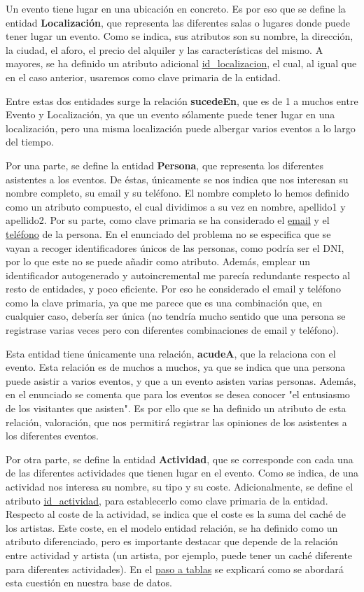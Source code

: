 \documentclass[a4paper,onecolumn]{article}
\begin{document}
\begin{sloppypar}
Un evento tiene lugar en una ubicación en concreto. Es por eso que se define la entidad \textbf{Localización}, que representa las diferentes
salas o lugares donde puede tener lugar un evento. Como se indica, sus atributos son su nombre, la dirección, la ciudad, el aforo,
el precio del alquiler y las características del mismo. A mayores, se ha definido un atributo adicional \underline{id\_localizacion},
el cual, al igual que en el caso anterior, usaremos como clave primaria de la entidad.

Entre estas dos entidades surge la relación \textbf{sucedeEn}, que es de 1 a muchos entre Evento y Localización, ya que un evento sólamente puede
tener lugar en una localización, pero una misma localización puede albergar varios eventos a lo largo del tiempo.

Por una parte, se define la entidad \textbf{Persona}, que representa los diferentes asistentes a los eventos. De éstas, únicamente se nos indica 
que nos interesan su nombre completo, su email y su teléfono. El nombre completo lo hemos definido como un atributo compuesto, el cual dividimos
a su vez en nombre, apellido1 y apellido2. Por su parte, como clave primaria se ha considerado el \underline{email} y el \underline{teléfono} de la 
persona. En el enunciado del problema no se especifica que se vayan a recoger identificadores únicos de las personas, como podría ser el DNI, por lo que
este no se puede añadir como atributo. Además, emplear un identificador autogenerado y autoincremental me parecía redundante respecto al resto de 
entidades, y poco eficiente. Por eso he considerado el email y teléfono como la clave primaria, ya que me parece que es una combinación que, en cualquier
caso, debería ser única (no tendría mucho sentido que una persona se registrase varias veces pero con diferentes combinaciones de email y teléfono).

Esta entidad tiene únicamente una relación, \textbf{acudeA}, que la relaciona con el evento. Esta relación es de muchos a muchos, ya que se indica que una persona
puede asistir a varios eventos, y que a un evento asisten varias personas. Además, en el enunciado se comenta que para los eventos se desea conocer
"el entusiasmo de los visitantes que asisten". Es por ello que se ha definido un atributo de esta relación, valoración, que nos permitirá registrar
las opiniones de los asistentes a los diferentes eventos.

Por otra parte, se define la entidad \textbf{Actividad}, que se corresponde con cada una de las diferentes actividades que tienen lugar en el evento.
Como se indica, de una actividad nos interesa su nombre, su tipo y su coste. Adicionalmente, se define el atributo \underline{id\_actividad}, para 
establecerlo como clave primaria de la entidad. Respecto al coste de la actividad, se indica que el coste es la suma del caché de los artistas. 
Este coste, en el modelo entidad relación, se ha definido como un atributo diferenciado, pero es importante destacar que depende de la relación entre
actividad y artista (un artista, por ejemplo, puede tener un caché diferente para diferentes actividades). En el \hyperref[mr]{paso a tablas} se 
explicará como se abordará esta cuestión en nuestra base de datos.


\end{sloppypar}
\end{document}
